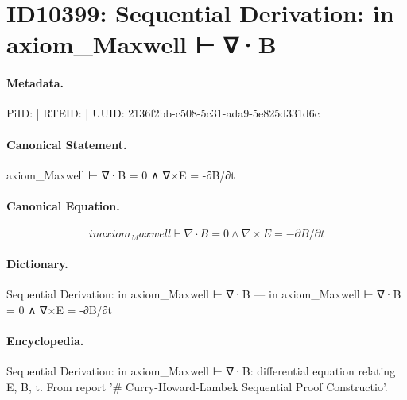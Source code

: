 \section*{ID10399: Sequential Derivation: in axiom\_Maxwell ⊢ ∇·B}
\paragraph{Metadata.}
PiID:  | RTEID:  | UUID: 2136f2bb-c508-5c31-ada9-5e825d331d6c

\paragraph{Canonical Statement.}
axiom\_Maxwell ⊢ ∇·B = 0 ∧ ∇×E = -∂B/∂t

\paragraph{Canonical Equation.}
\[
in axiom_Maxwell ⊢ ∇·B = 0 ∧ ∇×E = -∂B/∂t
\]

\paragraph{Dictionary.}
Sequential Derivation: in axiom\_Maxwell ⊢ ∇·B — in axiom\_Maxwell ⊢ ∇·B = 0 ∧ ∇×E = -∂B/∂t

\paragraph{Encyclopedia.}
Sequential Derivation: in axiom\_Maxwell ⊢ ∇·B: differential equation relating E, B, t. From report '\# Curry-Howard-Lambek Sequential Proof Constructio'.
